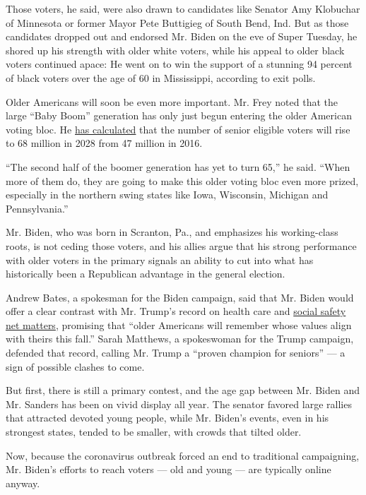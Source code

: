 Those voters, he said, were also drawn to candidates like Senator Amy
Klobuchar of Minnesota or former Mayor Pete Buttigieg of South Bend,
Ind. But as those candidates dropped out and endorsed Mr. Biden on the
eve of Super Tuesday, he shored up his strength with older white voters,
while his appeal to older black voters continued apace: He went on to
win the support of a stunning 94 percent of black voters over the age of
60 in Mississippi, according to exit polls.

Older Americans will soon be even more important. Mr. Frey noted that
the large ``Baby Boom'' generation has only just begun entering the
older American voting bloc. He
\href{https://academic.oup.com/ppar/article/28/1/9/4958149}{has
calculated} that the number of senior eligible voters will rise to 68
million in 2028 from 47 million in 2016.

``The second half of the boomer generation has yet to turn 65,'' he
said. ``When more of them do, they are going to make this older voting
bloc even more prized, especially in the northern swing states like
Iowa, Wisconsin, Michigan and Pennsylvania.''

Mr. Biden, who was born in Scranton, Pa., and emphasizes his
working-class roots, is not ceding those voters, and his allies argue
that his strong performance with older voters in the primary signals an
ability to cut into what has historically been a Republican advantage in
the general election.

Andrew Bates, a spokesman for the Biden campaign, said that Mr. Biden
would offer a clear contrast with Mr. Trump's record on health care and
\href{https://www.nytimes.com/2020/01/22/us/politics/medicare-trump.html}{social
safety net matters}, promising that ``older Americans will remember
whose values align with theirs this fall.'' Sarah Matthews, a
spokeswoman for the Trump campaign, defended that record, calling Mr.
Trump a ``proven champion for seniors'' --- a sign of possible clashes
to come.

But first, there is still a primary contest, and the age gap between Mr.
Biden and Mr. Sanders has been on vivid display all year. The senator
favored large rallies that attracted devoted young people, while Mr.
Biden's events, even in his strongest states, tended to be smaller, with
crowds that tilted older.

Now, because the coronavirus outbreak forced an end to traditional
campaigning, Mr. Biden's efforts to reach voters --- old and young ---
are typically online anyway.

